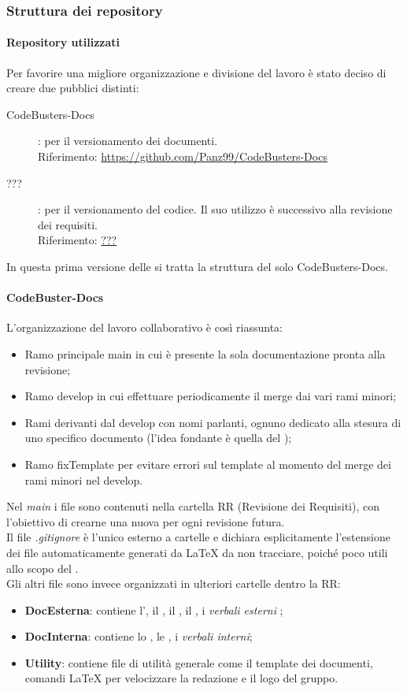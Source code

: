 \subsubsection{Struttura dei repository}
\paragraph{Repository utilizzati}
Per favorire una migliore organizzazione e divisione del lavoro è stato deciso di creare due  pubblici distinti:
\begin{description}
	\item[CodeBusters-Docs] : per il versionamento dei documenti. \\
	Riferimento: \url{https://github.com/Panz99/CodeBusters-Docs}
	\item[???] : per il versionamento del codice. Il suo utilizzo è successivo alla revisione dei requisiti. \\
	Riferimento: \url{???}
\end{description}
In questa prima versione delle \NdPv si tratta la struttura del solo  CodeBusters-Docs. 

\paragraph{CodeBuster-Docs}
L'organizzazione del lavoro collaborativo è così riassunta:
\begin{itemize}
	\item Ramo principale main in cui è presente la sola documentazione pronta alla revisione;	
	\item Ramo develop in cui effettuare periodicamente il merge dai vari rami minori;
	\item Rami derivanti dal develop con nomi parlanti, ognuno dedicato alla stesura di uno specifico documento (l'idea fondante è quella del );
	\item Ramo fixTemplate per evitare errori sul template al momento del merge dei rami minori nel develop.
\end{itemize}
Nel \textit{main} i file sono contenuti nella cartella RR (Revisione dei Requisiti), con l'obiettivo di crearne una nuova per ogni revisione futura. \\
Il file \textit{.gitignore} è l'unico esterno a cartelle e dichiara esplicitamente l'estensione dei file automaticamente generati da \LaTeX{} da non tracciare, poiché poco utili allo scopo del . \\
Gli altri file sono invece organizzati in ulteriori cartelle dentro la RR:
\begin{itemize}
	\item \textbf{DocEsterna}: contiene l'\AdRv, il \PdPv, il \PdQv, il \Glossariov, i \textit{verbali esterni} ;
	\item \textbf{DocInterna}: contiene lo \SdFv, le \NdPv, i \textit{verbali interni};
	\item \textbf{Utility}: contiene file di utilità generale come il template dei documenti, comandi \LaTeX{} per velocizzare la redazione e il logo del gruppo.
\end{itemize}
	

